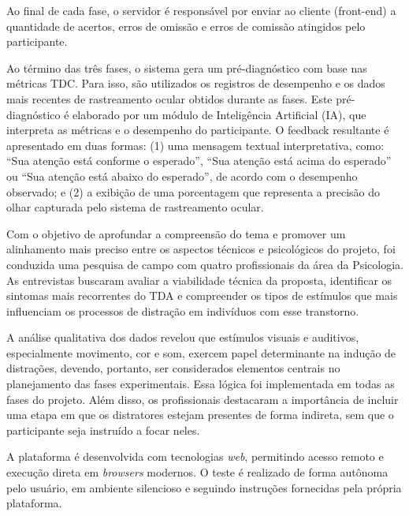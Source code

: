 Ao final de cada fase, o servidor é responsável por enviar ao cliente (front-end) a quantidade de acertos, erros de omissão e erros de comissão atingidos pelo participante.

Ao término das três fases, o sistema gera um pré-diagnóstico com base nas métricas TDC. Para isso, são utilizados os registros de desempenho e os dados mais recentes de rastreamento ocular obtidos durante as fases. Este pré-diagnóstico é elaborado por um módulo de Inteligência Artificial (IA), que interpreta as métricas e o desempenho do participante. O feedback resultante é apresentado em duas formas: (1) uma mensagem textual interpretativa, como: “Sua atenção está conforme o esperado”, “Sua atenção está acima do esperado” ou “Sua atenção está abaixo do esperado”, de acordo com o desempenho observado; e (2) a exibição de uma porcentagem que representa a precisão do olhar capturada pelo sistema de rastreamento ocular.

Com o objetivo de aprofundar a compreensão do tema e promover um alinhamento mais preciso entre os aspectos técnicos e psicológicos do projeto, foi conduzida uma pesquisa de campo com quatro profissionais da área da Psicologia. As entrevistas buscaram avaliar a viabilidade técnica da proposta, identificar os sintomas mais recorrentes do TDA e compreender os tipos de estímulos que mais influenciam os processos de distração em indivíduos com esse transtorno.

A análise qualitativa dos dados revelou que estímulos visuais e auditivos, especialmente movimento, cor e som, exercem papel determinante na indução de distrações, devendo, portanto, ser considerados elementos centrais no planejamento das fases experimentais. Essa lógica foi implementada em todas as fases do projeto.
Além disso, os profissionais destacaram a importância de incluir uma etapa em que os distratores estejam presentes de forma indireta, sem que o participante seja instruído a focar neles.

A plataforma é desenvolvida com tecnologias \textit{web}, permitindo acesso remoto e execução
direta em \textit{browsers} modernos. O teste é realizado de forma autônoma pelo usuário, em ambiente silencioso e seguindo instruções fornecidas pela própria plataforma.


